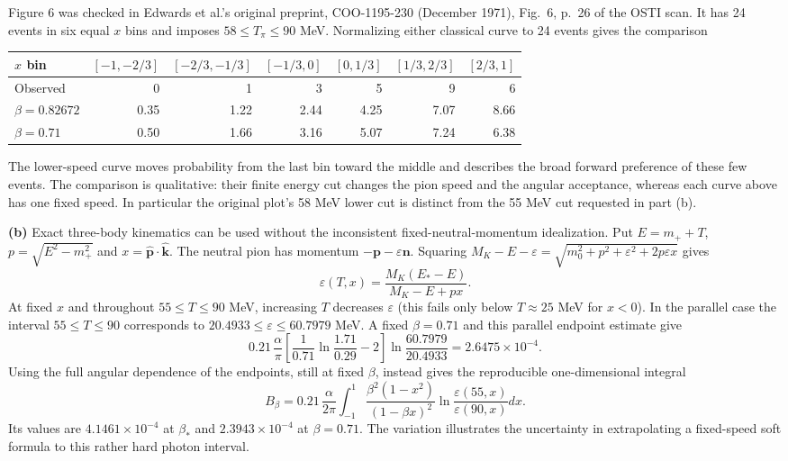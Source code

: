 Figure 6 was checked in Edwards et al.'s original preprint,
COO-1195-230 (December 1971), Fig.~6, p.~26 of the OSTI scan.
It has 24 events in six equal $x$ bins and imposes
$58\leq T_\pi\leq90$ MeV.  Normalizing either classical curve to
24 events gives the comparison
\begin{center}
\begin{tabular}{lrrrrrr}
\toprule
$x$ bin&$[-1,-2/3]$&$[-2/3,-1/3]$&$[-1/3,0]$&$[0,1/3]$&$[1/3,2/3]$&$[2/3,1]$\\
\midrule
Observed&0&1&3&5&9&6\\
$\beta=0.82672$&0.35&1.22&2.44&4.25&7.07&8.66\\
$\beta=0.71$&0.50&1.66&3.16&5.07&7.24&6.38\\
\bottomrule
\end{tabular}
\end{center}
\begin{center}\end{center}
The lower-speed curve moves probability from the last bin toward the
middle and describes the broad forward preference of these few events.
The comparison is qualitative: their finite energy cut changes the
pion speed and the angular acceptance, whereas each curve above has
one fixed speed.  In particular the original plot's 58 MeV lower
cut is distinct from the 55 MeV cut requested in part (b).

\medskip\noindent\textbf{(b)} Exact three-body kinematics can be
used without the inconsistent fixed-neutral-momentum idealization.
Put $E=m_++T$, $p=\sqrt{E^2-m_+^2}$ and
$x=\widehat{\mathbf p}\cdot\widehat{\mathbf k}$.
The neutral pion has momentum $-\mathbf p-\varepsilon\mathbf n$.
Squaring $M_K-E-\varepsilon=\sqrt{m_0^2+p^2+\varepsilon^2+2p\varepsilon x}$
gives
\[
\boxed{\varepsilon(T,x)=
\frac{M_K(E_*-E)}{M_K-E+px}.}
\]
At fixed $x$ and throughout $55\leq T\leq90$ MeV, increasing $T$ decreases $\varepsilon$ (this fails only below $T\approx25$ MeV for $x<0$).  In the
parallel case the interval $55\leq T\leq90$ corresponds to
$20.4933\leq\varepsilon\leq60.7979$ MeV.  A fixed $\beta=0.71$
and this parallel endpoint estimate give
\[
0.21\,\frac{\alpha}{\pi}
\left[\frac1{0.71}\ln\frac{1.71}{0.29}-2\right]
\ln\frac{60.7979}{20.4933}
=2.6475\times10^{-4}.
\]
Using the full angular dependence of the endpoints, still at fixed
$\beta$, instead gives the reproducible one-dimensional integral
\[
B_\beta=0.21\,\frac{\alpha}{2\pi}
\int_{-1}^1\frac{\beta^2(1-x^2)}{(1-\beta x)^2}
 \ln\frac{\varepsilon(55,x)}{\varepsilon(90,x)}dx.
\]
Its values are $4.1461\times10^{-4}$ at $\beta_*$ and
$2.3943\times10^{-4}$ at $\beta=0.71$.  The variation illustrates
the uncertainty in extrapolating a fixed-speed soft formula to this
rather hard photon interval.

